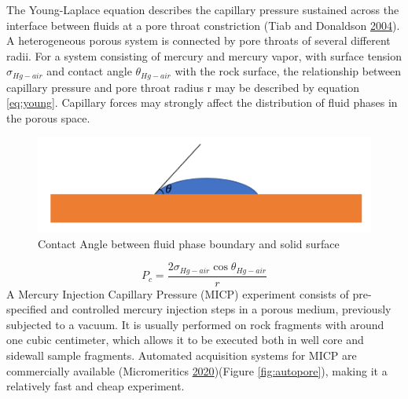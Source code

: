 \documentclass[english,msc,numbers]{coppe}
\begin{document}
  The Young-Laplace equation describes the capillary pressure sustained across the interface between fluids at a pore throat constriction (Tiab and Donaldson \protect\hyperlink{ref-Tiab2004}{2004}). A heterogeneous porous system is connected by pore throats of several different radii. For a system consisting of mercury and mercury vapor, with surface tension \(\sigma_{Hg-air}\) and contact angle \(\theta_{Hg-air}\) with the rock surface, the relationship between capillary pressure and pore throat radius r may be described by equation \eqref{eq:young}. Capillary forces may strongly affect the distribution of fluid phases in the porous space.
  \begin{figure}
  
  {\centering \includegraphics[width=0.8\linewidth]{figure/2-2-Contact-Angle} 
  
  }
  
  \caption{Contact Angle between fluid phase boundary and solid surface}\label{fig:contact-angle}
  \end{figure}
  \begin{equation} 
    P_c = \frac{2\sigma_{Hg-air} \cos{\theta_{Hg-air}}}{r}
    \label{eq:young}
  \end{equation}
  A Mercury Injection Capillary Pressure (MICP) experiment consists of pre-specified and controlled mercury injection steps in a porous medium, previously subjected to a vacuum. It is usually performed on rock fragments with around one cubic centimeter, which allows it to be executed both in well core and sidewall sample fragments. Automated acquisition systems for MICP are commercially available (Micromeritics \protect\hyperlink{ref-Micromeritics2020}{2020})(Figure \ref{fig:autopore}), making it a relatively fast and cheap experiment.
  
\end{document}
